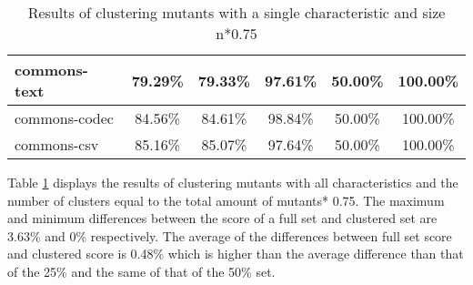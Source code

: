 \documentclass[../../main]{subfiles}
\begin{document}
\begin{table}[!htb]
\begin{tabular}{|l|c|c|c|c|c|}
commons-text                  & 79.29\%                                                                                 & 79.33\%                                                                                     & 97.61\%                                                                              & 50.00\%                                                                               & 100.00\%                                                                             \\ \hline
commons-codec                 & 84.56\%                                                                                 & 84.61\%                                                                                     & 98.84\%                                                                              & 50.00\%                                                                               & 100.00\%                                                                             \\ \hline
commons-csv                   & 85.16\%                                                                                 & 85.07\%                                                                                     & 97.64\%                                                                              & 50.00\%                                                                               & 100.00\%                                                                             \\ \hline
\end{tabular}
\caption{\label{tab:clustering_all_75}Results of clustering mutants with a single characteristic and size n*0.75}
\end{table}
\FloatBarrier

Table \ref{tab:clustering_all_75} displays the results of clustering mutants with all characteristics and the number of clusters equal to the total amount of mutants* 0.75.  
The maximum and minimum differences between the score of a full set and clustered set are 3.63\% and 0\% respectively.  
The average of the differences between full set score and clustered score is 0.48\% which is higher than the average difference than that of the 25\% and the same of that of the 50\% set.
\end{document}
